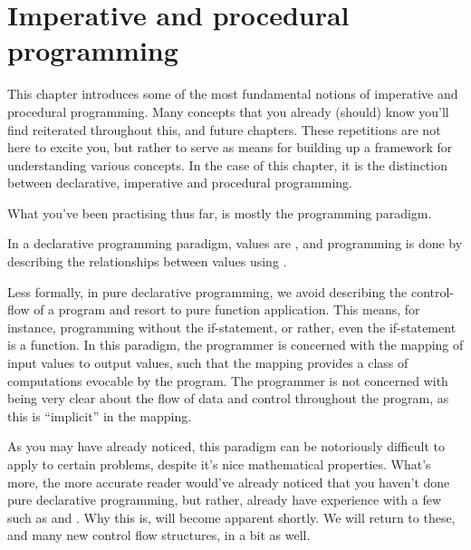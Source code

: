 \chapter{Imperative and procedural programming}

This chapter introduces some of the most fundamental notions of imperative and
procedural programming.  Many concepts that you already (should) know you'll
find reiterated throughout this, and future chapters.  These repetitions are
not here to excite you, but rather to serve as means for building up a
framework for understanding various concepts.  In the case of this chapter, it
is the distinction between declarative, imperative and procedural programming.

What you've been practising thus far, is mostly the 
programming paradigm.

\begin{definition}

In a declarative programming paradigm, values are , and
programming is done by describing the relationships between values using
.

\end{definition}


Less formally, in pure declarative programming, we avoid describing the
control-flow of a program and resort to pure function application. This means,
for instance, programming without the if-statement, or rather, even the
if-statement is a function. In this paradigm, the programmer is concerned with
the mapping of input values to output values, such that the mapping provides a
class of computations evocable by the program. The programmer is not concerned
with being very clear about the flow of data and control throughout the
program, as this is ``implicit'' in the mapping.


As you may have already noticed, this paradigm can be notoriously difficult to
apply to certain problems, despite it's nice mathematical properties. What's
more, the more accurate reader would've already noticed that you haven't done
pure declarative programming, but rather, already have experience with a few
 such as  and 
. Why this is, will become apparent shortly. We will return to
these, and many new control flow structures, in a bit as well.

